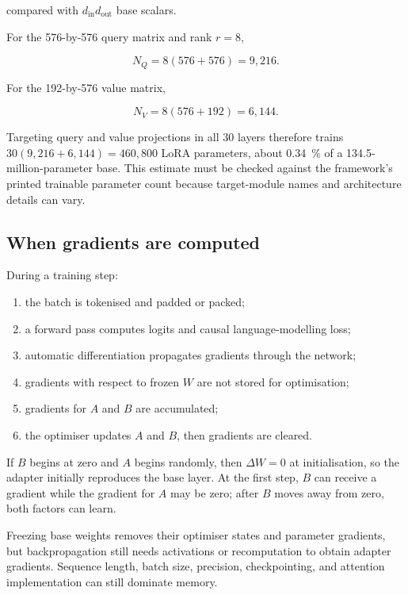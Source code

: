 compared with $d_{\mathrm{in}}d_{\mathrm{out}}$ base scalars.

\begin{workedexample}
For the 576-by-576 query matrix and rank $r=8$,

\[
    N_Q = 8(576+576)=9{,}216.
\]

For the 192-by-576 value matrix,

\[
    N_V = 8(576+192)=6{,}144.
\]

Targeting query and value projections in all 30 layers therefore trains
$30(9{,}216+6{,}144)=460{,}800$ LoRA parameters, about \qty{0.34}{\percent} of
a 134.5-million-parameter base.
This estimate must be checked against the framework's printed trainable
parameter count because target-module names and architecture details can vary.
\end{workedexample}

\subsection{When gradients are computed}

During a training step:

\begin{enumerate}
    \item the batch is tokenised and padded or packed;
    \item a forward pass computes logits and causal language-modelling loss;
    \item automatic differentiation propagates gradients through the network;
    \item gradients with respect to frozen $W$ are not stored for optimisation;
    \item gradients for $A$ and $B$ are accumulated;
    \item the optimiser updates $A$ and $B$, then gradients are cleared.
\end{enumerate}

If $B$ begins at zero and $A$ begins randomly, then $\Delta W=0$ at
initialisation, so the adapter initially reproduces the base layer.
At the first step, $B$ can receive a gradient while the gradient for $A$ may be
zero; after $B$ moves away from zero, both factors can learn.

\begin{cautionbox}
Freezing base weights removes their optimiser states and parameter gradients,
but backpropagation still needs activations or recomputation to obtain adapter
gradients.
Sequence length, batch size, precision, checkpointing, and attention
implementation can still dominate memory.
\end{cautionbox}

